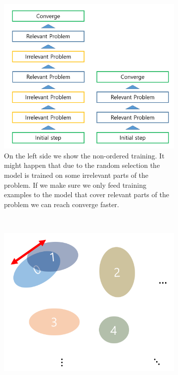 \begin{figure}
	\centering
	\begin{subfigure}{0.5\textwidth}
		\centering
		\includegraphics[width=1.0\linewidth]{../figures/non_orderd_vs_ordered_learning}
		\caption{On the left side we show the non-ordered training. It might happen that due to the random selection the model is trained on some irrelevant parts of the problem. If we make sure we only feed training examples to the model that cover relevant parts of the problem we can reach converge faster.}
		\label{fig:nonorderdvsorderedlearning}
	\end{subfigure}%
	~
	\begin{subfigure}{0.5\textwidth}
		\centering
		\includegraphics[width=1.0\linewidth]{../figures/optimizing_overlapping_classes}

\end{subfigure}
\end{figure}
